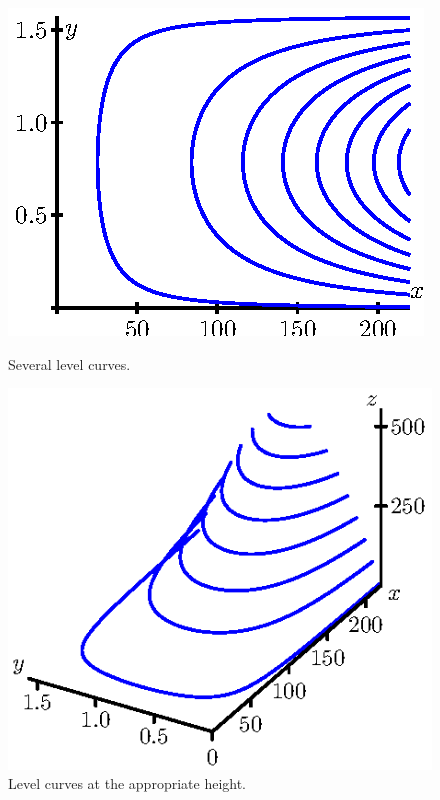 \begin{figure}[ht]
\begin{center}
\begin{minipage}{2.5in}
\begin{center}
\includegraphics{figures/fig_9_1_contour_1.eps}
\caption{Several level curves.}
\label{F:9.1.contours_1}
\end{center}
\end{minipage}
\hspace{0.5in}
\begin{minipage}{2.5in}
\begin{center}
\includegraphics{figures/fig_9_1_contour_2.eps}
\caption{Level curves at the appropriate height.}
\label{F:9.1.contours_2}
\end{center}
\end{minipage}
\end{center}
\end{figure}

